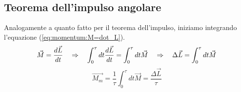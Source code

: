 \subsection{Teorema dell'impulso angolare}
Analogamente a quanto fatto per il teorema dell'impulso, iniziamo integrando
l'equazione (\ref{eq:momentum:M=dot_L}).
\begin{equation}
    \vec M = \frac{d\vec L}{dt} \quad\Rightarrow\quad \int_0^\tau dt\frac{d\vec L}{dt} = \int_0^\tau dt \vec M \quad\Rightarrow\quad \Delta \vec L =\int_0^\tau dt \vec M 
\end{equation}
\begin{equation}
    \vec{M_m} = \frac1\tau\int_0^\tau dt \vec M = \frac{\Delta \vec L}{\tau}
\end{equation}